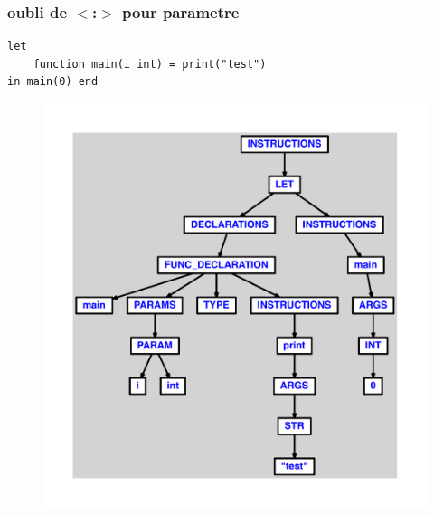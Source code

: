 \documentclass{article}
\begin{document}
\subsubsection{oubli de $ < $:$ > $ pour parametre}
\begin{lstlisting}
let
	function main(i int) = print("test")
in main(0) end
\end{lstlisting}
\newpage
\begin{figure}[H]
\centering
\includegraphics[max width=\textwidth]{ast/ast_218.pdf}
\end{figure}
\newpage
\end{document}
